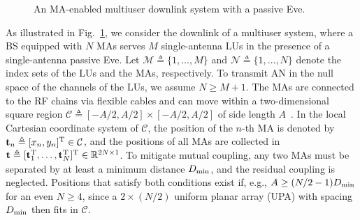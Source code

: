 \documentclass[journal]{IEEEtran}
\newcommand{\phoneicon}[2]{%
  \begin{scope}[shift={#1}]
    \draw[rounded corners=1.3pt, line width=0.5pt, fill=white] (-0.135,-0.25) rectangle (0.135,0.25);
    \fill[#2] (-0.1,-0.17) rectangle (0.1,0.2);
    \fill[black!55] (0,-0.212) circle (0.02);
  \end{scope}}
\begin{document}
\begin{figure}[t]
\caption{An MA-enabled multiuser downlink system with a passive Eve.}
\label{fig:system}
\end{figure}

As illustrated in Fig.~\ref{fig:system}, we consider the downlink of a multiuser system, where a BS equipped with $N$ MAs serves $M$ single-antenna LUs in the presence of a single-antenna passive Eve. Let $\mathcal M\triangleq\{1,\ldots,M\}$ and $\mathcal N\triangleq\{1,\ldots,N\}$ denote the index sets of the LUs and the MAs, respectively. To transmit AN in the null space of the channels of the LUs, we assume $N\ge M+1$. The MAs are connected to the RF chains via flexible cables and can move within a two-dimensional square region $\mathcal C\triangleq[-A/2,A/2]\times[-A/2,A/2]$ of side length $A$~\cite{ZhuMag2024,ZhuTWC2024Model}. In the local Cartesian coordinate system of $\mathcal C$, the position of the $n$-th MA is denoted by $\mathbf{t}_n\triangleq[x_n,y_n]^{\mathrm T}\in\mathcal C$, and the positions of all MAs are collected in $\mathbf{t}\triangleq[\mathbf{t}_1^{\mathrm T},\ldots,\mathbf{t}_N^{\mathrm T}]^{\mathrm T}\in\mathbb R^{2N\times1}$. To mitigate mutual coupling, any two MAs must be separated by at least a minimum distance $D_{\min}$, and the residual coupling is neglected. Positions that satisfy both conditions exist if, e.g., $A\ge(N/2-1)D_{\min}$ for an even $N\ge4$, since a $2\times(N/2)$ uniform planar array (UPA) with spacing $D_{\min}$ then fits in $\mathcal C$.
\end{document}

